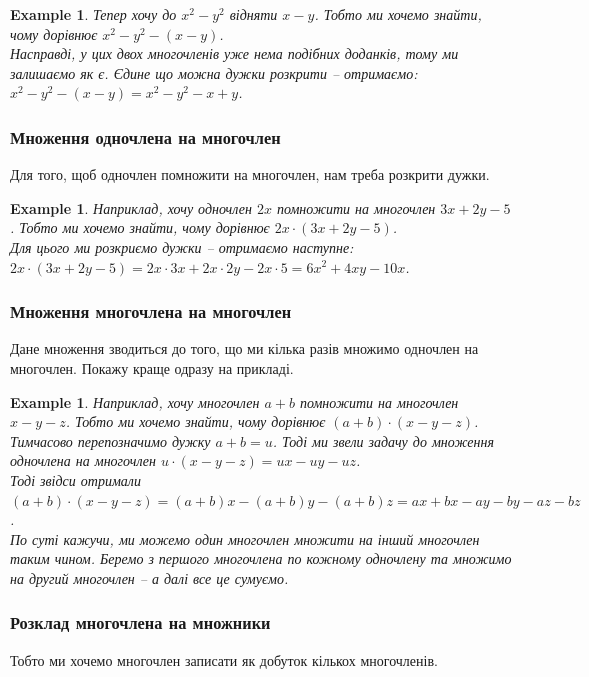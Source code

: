 \documentclass[a4paper, 10pt]{article}
\theoremstyle{theoremdd}
\theoremstyle{theoremdd}
\theoremstyle{theoremdd}
\theoremstyle{theoremdd}
\newtheorem{example}[theorem]{Example}
\theoremstyle{theoremdd}
\theoremstyle{theoremdd}
\theoremstyle{theoremdd}
\theoremstyle{theoremdd}
\begin{document}
\begin{example}
Тепер хочу до $x^2 - y^2$ відняти $x - y$. Тобто ми хочемо знайти, чому дорівнює $x^2 - y^2 - (x - y)$.\\
Насправді, у цих двох многочленів уже нема подібних доданків, тому ми залишаємо як є. Єдине що можна дужки розкрити -- отримаємо:\\
$x^2 - y^2 - (x - y) = x^2 - y^2 - x + y$. 
\end{example}

\subsubsection*{Множення одночлена на многочлен}
Для того, щоб одночлен помножити на многочлен, нам треба розкрити дужки.

\begin{example}
Наприклад, хочу одночлен $2x$ помножити на многочлен $3x + 2y - 5$. Тобто ми хочемо знайти, чому дорівнює $2x \cdot (3x + 2y - 5)$.\\
Для цього ми розкриємо дужки -- отримаємо наступне:
$2x \cdot (3x + 2y - 5) = 2x \cdot 3x + 2x \cdot 2y - 2x \cdot 5 = 6x^2 + 4xy - 10x$.
\end{example}

\subsubsection*{Множення многочлена на многочлен}
Дане множення зводиться до того, що ми кілька разів множимо одночлен на многочлен. Покажу краще одразу на прикладі.

\begin{example}
Наприклад, хочу многочлен $a+b$ помножити на многочлен $x-y-z$. Тобто ми хочемо знайти, чому дорівнює $(a+b) \cdot (x-y-z)$.\\
Тимчасово перепозначимо дужку $a + b = u$. Тоді ми звели задачу до множення одночлена на многочлен $u \cdot (x-y-z) = ux - uy - uz$.\\
Тоді звідси отримали $(a+b) \cdot (x-y-z) = (a+b)x - (a+b)y - (a+b)z = ax + bx - ay - by - az - bz$.
\bigskip \\
По суті кажучи, ми можемо один многочлен множити на інший многочлен таким чином. Беремо з першого многочлена по кожному одночлену та множимо на другий многочлен -- а далі все це сумуємо.
\end{example}

\subsubsection*{Розклад многочлена на множники}
Тобто ми хочемо многочлен записати як добуток кількох многочленів.
\end{document}
